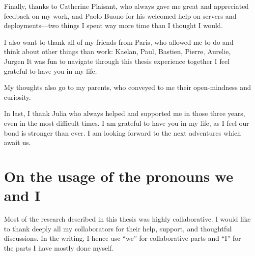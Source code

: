 Finally, thanks to Catherine Plaisant, who always gave me great and appreciated feedback on my work, and Paolo Buono for his welcomed help on servers and deployments---two things I spent way more time than I thought I would.

I also want to thank all of my friends from Paris, who allowed me to do and think about other things than work: Kaelan, Paul, Bastien, Pierre, Aurelie, Jurgen
It was fun to navigate through this thesis experience together
I feel grateful to have you in my life.

My thoughts also go to my parents, who conveyed to me their open-mindness and curiosity.

In last, I thank Julia who always helped and supported me in those three years, even in the most difficult times.
I am grateful to have you in my life, as I feel our bond is stronger than ever.
I am looking forward to the next adventures which await us.










\newpage
\section*{On the usage of the pronouns we and I}

Most of the research described in this thesis was highly collaborative.
I would like to thank deeply all my collaborators for their help, support, and thoughtful discussions.
In the writing, I hence use ``we'' for collaborative parts and ``I'' for the parts I have mostly done myself.























